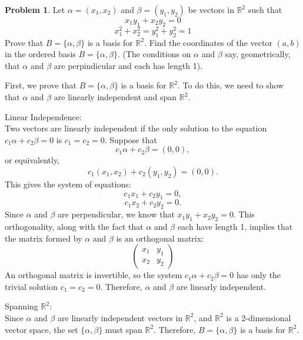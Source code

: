 \documentclass[12pt]{article}
\theoremstyle{definition}
\newtheorem{problem}{Problem}
\begin{document}
\begin{problem}
    Let $\alpha = (x_1, x_2)$ and $\beta = (y_1, y_2)$ be vectors in $\mathbb{R}^2$ such that
    \[x_1y_1 + x_2y_2 = 0\]
    \[x_1^2 + x_2^2 = y_1^2 + y_2^2 = 1\]
    Prove that $B = \{\alpha, \beta\}$ is a basis for $\mathbb{R}^2$. Find the coordinates of the vector
    $(a, b)$ in the ordered basis $B = \{\alpha, \beta\}$. (The conditions on $\alpha$ and $\beta$ say, geometrically,
    that $\alpha$ and $\beta$ are perpindicular and each has length 1).

    \begin{solution}
        First, we prove that \( B = \{\alpha, \beta\} \) is a basis for \( \mathbb{R}^2 \). To do this, we need to show that \( \alpha \) and \( \beta \) are linearly independent and span \( \mathbb{R}^2 \).

        Linear Independence:\\
        Two vectors are linearly independent if the only solution to the equation \( c_1 \alpha + c_2 \beta = 0 \) is \( c_1 = c_2 = 0 \). Suppose that
        \[c_1 \alpha + c_2 \beta = (0, 0),\]
        or equivalently,
        \[c_1 (x_1, x_2) + c_2 (y_1, y_2) = (0, 0).\]
        This gives the system of equations:
        \[c_1 x_1 + c_2 y_1 = 0,\]
        \[c_1 x_2 + c_2 y_2 = 0.\]
        Since \( \alpha \) and \( \beta \) are perpendicular, we know that \( x_1 y_1 + x_2 y_2 = 0 \). This orthogonality, along with the fact that \( \alpha \) and \( \beta \) each have length 1, implies that the matrix formed by \( \alpha \) and \( \beta \) is an orthogonal matrix:
        \[
            \begin{pmatrix}
            x_1 & y_1 \\
            x_2 & y_2
            \end{pmatrix}
        \]
        An orthogonal matrix is invertible, so the system \( c_1 \alpha + c_2 \beta = 0 \) has only the trivial solution \( c_1 = c_2 = 0 \). Therefore, \( \alpha \) and \( \beta \) are linearly independent.
    
        Spanning \( \mathbb{R}^2 \):\\
        Since \( \alpha \) and \( \beta \) are linearly independent vectors in \( \mathbb{R}^2 \), and \( \mathbb{R}^2 \) is a 2-dimensional vector space, the set \( \{\alpha, \beta\} \) must span \( \mathbb{R}^2 \). Therefore, \( B = \{\alpha, \beta\} \) is a basis for \( \mathbb{R}^2 \).
    

\end{solution}
\end{problem}
\end{document}
